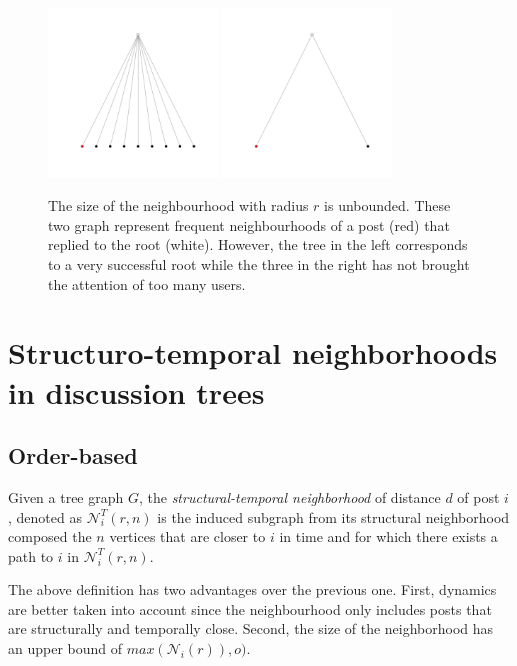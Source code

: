 \documentclass[smallextended]{svjour3}          %
\begin{document}
\begin{figure}
	\centering
	\includegraphics[width=0.4\textwidth]{large_neighborhood}
	\includegraphics[width=0.4\textwidth]{small_neighborhood}
	\caption{The size of the neighbourhood with radius $r$ is unbounded. These two graph represent frequent neighbourhoods of a post (red) that replied to the root (white). However, the tree in the left corresponds to a very successful root while the three in the right has not brought the attention of too many users.}
	\label{fig:large_neighbourhood}
\end{figure}


\section{Structuro-temporal neighborhoods in discussion trees}
\subsection{Order-based}
\begin{definition}
Given a tree graph $G$, the \textit{structural-temporal neighborhood} of distance $d$ of post $i$, denoted as $\mathcal{N}_{i}^T(r,n)$ is the induced subgraph from its structural neighborhood composed the $n$ vertices that are closer to $i$ in time and for which there exists a path to $i$ in $\mathcal{N}_{i}^T(r,n)$.  
\end{definition}

The above definition has two advantages over the previous one. First, dynamics are better taken into account since the neighbourhood only includes posts that are structurally and temporally close. Second, the size of the neighborhood has an upper bound of $max(\mathcal{N}_i(r)), o)$.
\end{document}
